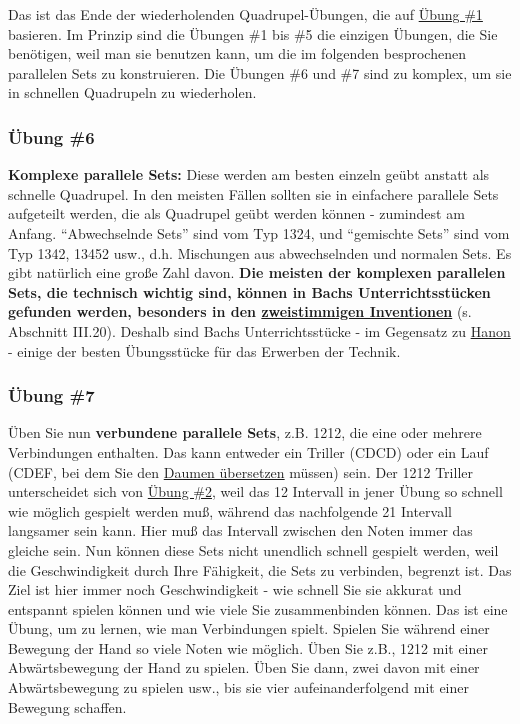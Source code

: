 Das ist das Ende der wiederholenden Quadrupel-Übungen, die auf \hyperlink{c1iii7b1}{Übung \#1} basieren.
Im Prinzip sind die Übungen \#1 bis \#5 die einzigen Übungen, die Sie benötigen, weil man sie benutzen kann, um die im folgenden besprochenen parallelen Sets zu konstruieren.
Die Übungen \#6 und \#7 sind zu komplex, um sie in schnellen Quadrupeln zu wiederholen.


\subsubsection{Übung \#6}\hypertarget{c1iii7b6}{}

\textbf{Komplexe parallele Sets:} Diese werden am besten einzeln geübt anstatt als schnelle Quadrupel.
In den meisten Fällen sollten sie in einfachere parallele Sets aufgeteilt werden, die als Quadrupel geübt werden können - zumindest am Anfang.
\enquote{Abwechselnde Sets} sind vom Typ 1324, und \enquote{gemischte Sets} sind vom Typ 1342, 13452 usw., d.h. Mischungen aus abwechselnden und normalen Sets.
Es gibt natürlich eine große Zahl davon.
\textbf{Die meisten der komplexen parallelen Sets, die technisch wichtig sind, können in Bachs Unterrichtsstücken gefunden werden, besonders in den \hyperlink{c1iii20}{zweistimmigen Inventionen}} (s. Abschnitt III.20).
Deshalb sind Bachs Unterrichtsstücke - im Gegensatz zu \hyperlink{c1iii7h}{Hanon} - einige der besten Übungsstücke für das Erwerben der Technik.


\subsubsection{Übung \#7}\hypertarget{c1iii7b7}{}

Üben Sie nun \textbf{verbundene parallele Sets}, z.B. 1212, die eine oder mehrere Verbindungen enthalten.
Das kann entweder ein Triller (CDCD) oder ein Lauf (CDEF, bei dem Sie den \hyperlink{c1iii5a}{Daumen übersetzen} müssen) sein.
Der 1212 Triller unterscheidet sich von \hyperlink{c1iii7b2}{Übung \#2}, weil das 12 Intervall in jener Übung so schnell wie möglich gespielt werden muß, während das nachfolgende 21 Intervall langsamer sein kann.
Hier muß das Intervall zwischen den Noten immer das gleiche sein.
Nun können diese Sets nicht unendlich schnell gespielt werden, weil die Geschwindigkeit durch Ihre Fähigkeit, die Sets zu verbinden, begrenzt ist.
Das Ziel ist hier immer noch Geschwindigkeit - wie schnell Sie sie akkurat und entspannt spielen können und wie viele Sie zusammenbinden können.
Das ist eine Übung, um zu lernen, wie man Verbindungen spielt.
Spielen Sie während einer Bewegung der Hand so viele Noten wie möglich.
Üben Sie z.B., 1212 mit einer Abwärtsbewegung der Hand zu spielen.
Üben Sie dann, zwei davon mit einer Abwärtsbewegung zu spielen usw., bis sie vier aufeinanderfolgend mit einer Bewegung schaffen.

